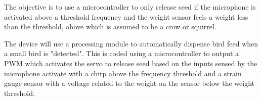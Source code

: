 The objective is to use a microcontroller to only release seed if the microphone is activated above a threshold frequency and the weight sensor feels a weight less than the threshold, above which is assumed to be a crow or squirrel.

The device will use a processing module to automatically dispense bird feed when a small bird is "detected". This is coded using a microcontroller to output a PWM which activates the servo to release seed based on the inputs sensed by the microphone activate with a chirp above the frequency threshold and a strain gauge sensor with a voltage related to the weight on the sensor below the weight threshold.
